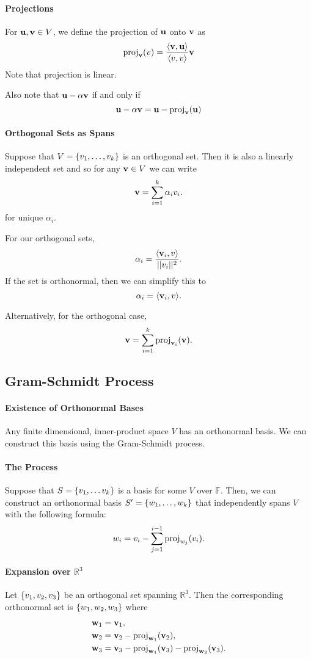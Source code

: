 \paragraph{Projections}
For \( \mathbf{u}, \mathbf{v} \in V \), we define the projection of \( \mathbf{u} \) onto \( \mathbf{v} \)
as \[
    \mathrm{proj}_{\mathbf{v}}(v) = \dfrac{
        \langle \mathbf{v}, \mathbf{u} \rangle
    }{
        \langle v, v \rangle
    } \mathbf{v}
\]
Note that projection is linear.

Also note that \( \mathbf{u} - \alpha \mathbf{v} \) if and only if \[
    \mathbf{u} - \alpha \mathbf{v} = \mathbf{u} - \mathrm{proj}_{\mathbf{v}}(\mathbf{u})
\]

\paragraph{Orthogonal Sets as Spans}
Suppose that \( V = \left\{ v_1, \dots, v_k \right\} \) is an orthogonal set.
Then it is also a linearly independent set and so for any \( \mathbf{v} \in V \)
we can write \[
    \mathbf{v} = \sum_{i=1}^k \alpha_i v_i. 
\] for unique \( \alpha_i \).

For our orthogonal sets, \[
    \alpha_i = \dfrac{\langle \mathbf{v}_i, v \rangle}{||v_i||^2}.
\]
If the set is orthonormal, then we can simplify this to \[
    \alpha_i = \langle \mathbf{v}_i, v \rangle.
\]

Alternatively, for the orthogonal case, \[
    \mathbf{v} = \sum_{i = 1}^{k} \mathrm{proj}_{\mathbf{v}_i}(\mathbf{v}).
\]

\subsection{Gram-Schmidt Process}

\paragraph{Existence of Orthonormal Bases}
Any finite dimensional, inner-product space \( V \) has an orthonormal basis.
We can construct this basis using the Gram-Schmidt process.

\paragraph{The Process}
Suppose that \( S = \left\{ v_1, \dots v_k \right\} \) is a basis for some \( V \)
over \( \mathbb{F} \).
Then, we can construct an orthonormal basis \( S' = \left\{ w_1, \dots, w_k \right\} \)
that independently spans \( V \) with the following formula: \[
    w_{i} = v_{i} - \sum_{j = 1}^{i - 1} \mathrm{proj}_{w_j}(v_i).
\]

\paragraph{Expansion over \( \mathbb{R}^3 \)}
Let \( \left\{ v_1, v_2, v_3 \right\} \) be an orthogonal set spanning \( \mathbb{R}^3 \).
Then the corresponding orthonormal set is \( \left\{ w_1, w_2, w_3 \right\} \) where
\begin{align*}
    \mathbf{w}_1     &= \mathbf{v}_1, \\
    \mathbf{w}_2     &= \mathbf{v}_2 - \mathrm{proj}_{\mathbf{w}_1}(\mathbf{v}_2), \\
    \mathbf{w}_3     &= \mathbf{v}_3 - \mathrm{proj}_{\mathbf{w}_1}(\mathbf{v}_3) - \mathrm{proj}_{\mathbf{w}_2}(\mathbf{v}_3).
\end{align*}

